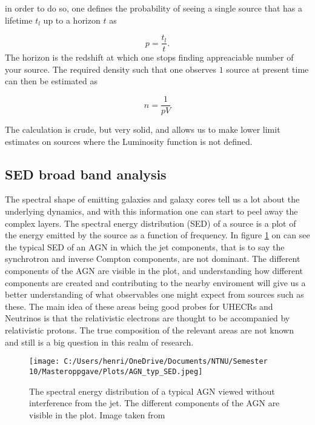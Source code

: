 in order to do so, one defines the probability of seeing a single source that has a lifetime $t_l $ up to a horizon $t$ as 

\begin{equation}
    p = \frac{t_l}{t}.
\end{equation}
The horizon is the redshift at which one stops finding appreaciable number of your source. The required density such that one observes $1$ source at present time can then be estimated as 

\begin{equation}
    n = \frac{1}{p V} 
\end{equation}

The calculation is crude, but very solid, and allows us to make lower limit estimates on sources where the Luminosity function is not defined. 

\subsection{SED broad band analysis}
The spectral shape of emitting galaxies and galaxy cores tell us a lot about the underlying dynamics, and with this information one can start to peel away the complex layers. The spectral energy distribution (SED) of a source is a plot of the energy emitted by the source as a function of frequency. In figure \ref{fig:AGN_SED} on can see the typical SED of an AGN in which the jet components, that is to say the synchrotron and inverse Compton components, are not dominant. The different components of the AGN are visible in the plot, and understanding how different components are created and contributing to the nearby enviroment will give us a better understanding of what observables one might expect from sources such as these. The main idea of these areas being good probes for UHECRs and Neutrinos is that the relativistic electrons are thought to be accompanied by relativistic protons. The true composition of the relevant areas are not known and still is a big question in this realm of research.

\begin{figure}
    \centering
    \texttt{[image: C:/Users/henri/OneDrive/Documents/NTNU/Semester 10/Masteroppgave/Plots/AGN\_typ\_SED.jpeg]}
    \caption{The spectral energy distribution of a typical AGN viewed without interference from the jet. The different components of the AGN are visible in the plot. Image taken from \cite{10.1093/mnras/stw2666}}
    \label{fig:AGN_SED}
\end{figure}

